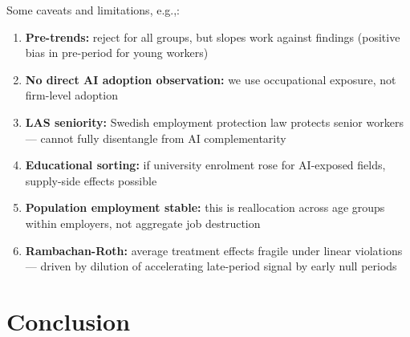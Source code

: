 \documentclass[aspectratio=169,11pt]{beamer}
\begin{document}
\begin{frame}{Some caveats and limitations, e.g.,:}
\begin{enumerate}
    \item \textbf{Pre-trends:} reject for all groups, but slopes work against findings (positive bias in pre-period for young workers)
    \item \textbf{No direct AI adoption observation:} we use occupational exposure, not firm-level adoption
    \item \textbf{LAS seniority:} Swedish employment protection law protects senior workers --- cannot fully disentangle from AI complementarity
    \item \textbf{Educational sorting:} if university enrolment rose for AI-exposed fields, supply-side effects possible
    \item \textbf{Population employment stable:} this is reallocation across age groups within employers, not aggregate job destruction
    \item \textbf{Rambachan-Roth:} average treatment effects fragile under linear violations --- driven by dilution of accelerating late-period signal by early null periods
\end{enumerate}
\end{frame}

\section{Conclusion}
\end{document}

